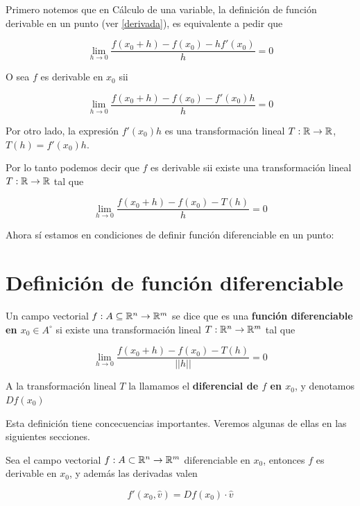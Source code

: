 Primero notemos que en Cálculo de una variable, la definición de función derivable en un punto (ver \ref{derivada}), es equivalente a pedir que

$$ \lim_{h \to 0} \frac{f(x_0 + h) - f(x_0) - h f'(x_0)}{h} = 0 $$

O sea $f$ es derivable en $x_0$ sii 

$$ \lim_{h \to 0} \frac{ f(x_0 + h) - f(x_0) - f'(x_0) h }{ h } = 0 $$

Por otro lado, la expresión $ f'(x_0) h$ es una transformación lineal $T : \mathbb{R} \to \mathbb{R}$, $T(h) = f'(x_0) h$.

Por lo tanto podemos decir que $f$ es derivable sii existe una transformación lineal $T : \mathbb{R} \to \mathbb{R}$ tal que

$$ \lim_{h \to 0} \frac{ f(x_0 + h) - f(x_0) - T(h) }{ h } = 0 $$

Ahora sí estamos en condiciones de definir función diferenciable en un punto:

\section{Definición de función diferenciable}

\begin{definition}[Diferenciabilidad]
Un campo vectorial $ f : A \subseteq \mathbb{R}^n \to \mathbb{R}^m$ se dice que es una \textbf{función diferenciable en $ x_0 \in A^{\circ} $}  si existe una transformación lineal $ T : \mathbb{R}^n \to \mathbb{R}^m$ tal que


$$  \lim_{h \to 0} \frac{ f(x_0 + h) - f(x_0) - T(h) }{ ||h|| } = 0 $$

A la transformación lineal $T$ la llamamos el \textbf{diferencial de $f$ en $x_0$}, y denotamos $Df(x_0)$
\end{definition}

Esta definición tiene concecuencias importantes.  Veremos algunas de ellas en las siguientes secciones.

\begin{theorem} \label{dif_impl_deriv}
Sea el campo vectorial $ f : A \subset \mathbb{R}^n \to \mathbb{R}^m$ diferenciable en $ x_0 $, entonces $f$ es derivable en $x_0$, y además las derivadas valen 

$$ f'(x_0, \hat{v}) = D f(x_0) \cdot \hat{v}$$
\end{theorem}

